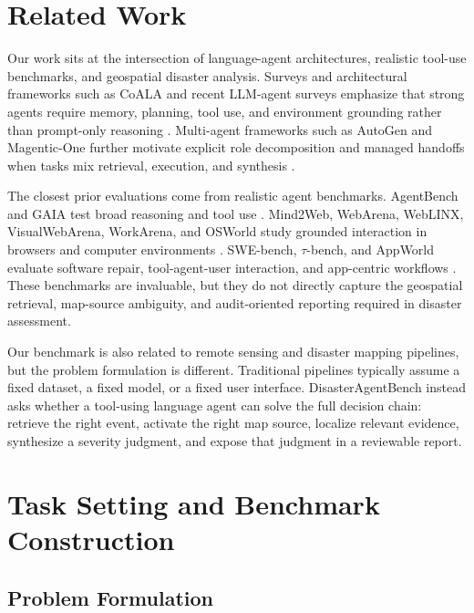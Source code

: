 \documentclass{article}
\begin{document}
\section{Related Work}

Our work sits at the intersection of language-agent architectures, realistic tool-use benchmarks, and geospatial disaster analysis. Surveys and architectural frameworks such as CoALA and recent LLM-agent surveys emphasize that strong agents require memory, planning, tool use, and environment grounding rather than prompt-only reasoning \citep{wang2024survey_llm_autonomous_agents, xi2025rise_potential_llm_agents, sumers2024coala}. Multi-agent frameworks such as AutoGen and Magentic-One further motivate explicit role decomposition and managed handoffs when tasks mix retrieval, execution, and synthesis \citep{wu2023autogen, fourney2024magentic_one}.

The closest prior evaluations come from realistic agent benchmarks. AgentBench and GAIA test broad reasoning and tool use \citep{liu2024agentbench, mialon2024gaia}. Mind2Web, WebArena, WebLINX, VisualWebArena, WorkArena, and OSWorld study grounded interaction in browsers and computer environments \citep{deng2023mind2web, zhou2023webarena, lu2024weblinx, koh2024visualwebarena, drouin2024workarena, xie2024osworld}. SWE-bench, $\tau$-bench, and AppWorld evaluate software repair, tool-agent-user interaction, and app-centric workflows \citep{jimenez2024swe_bench, yao2024tau_bench, trivedi2024appworld}. These benchmarks are invaluable, but they do not directly capture the geospatial retrieval, map-source ambiguity, and audit-oriented reporting required in disaster assessment.

Our benchmark is also related to remote sensing and disaster mapping pipelines, but the problem formulation is different. Traditional pipelines typically assume a fixed dataset, a fixed model, or a fixed user interface. DisasterAgentBench instead asks whether a tool-using language agent can solve the full decision chain: retrieve the right event, activate the right map source, localize relevant evidence, synthesize a severity judgment, and expose that judgment in a reviewable report.

\section{Task Setting and Benchmark Construction}

\subsection{Problem Formulation}
\end{document}
